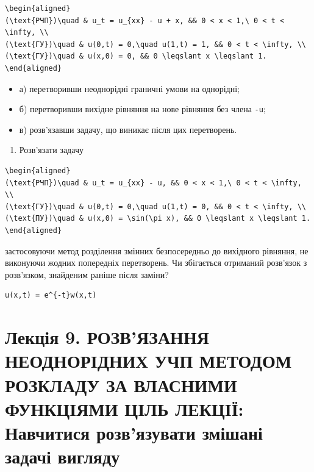 \documentclass[
  ukrainian,
]{article}
\providecommand{\tightlist}{%
  \setlength{\itemsep}{0pt}\setlength{\parskip}{0pt}}
\begin{document}
\begin{verbatim}
\begin{aligned}
(\text{РЧП})\quad & u_t = u_{xx} - u + x, && 0 < x < 1,\ 0 < t < \infty, \\
(\text{ГУ})\quad & u(0,t) = 0,\quad u(1,t) = 1, && 0 < t < \infty, \\
(\text{ГУ})\quad & u(x,0) = 0, && 0 \leqslant x \leqslant 1.
\end{aligned}
\end{verbatim}

\begin{itemize}
\tightlist
\item
  а) перетворивши неоднорідні граничні умови на однорідні;
\item
  б) перетворивши вихідне рівняння на нове рівняння без члена
  \texttt{-u};
\item
  в) розв'язавши задачу, що виникає після цих перетворень.
\end{itemize}

\begin{enumerate}
\def\labelenumi{\arabic{enumi}.}
\setcounter{enumi}{2}
\tightlist
\item
  Розв'язати задачу
\end{enumerate}

\begin{verbatim}
\begin{aligned}
(\text{РЧП})\quad & u_t = u_{xx} - u, && 0 < x < 1,\ 0 < t < \infty, \\
(\text{ГУ})\quad & u(0,t) = 0,\quad u(1,t) = 0, && 0 < t < \infty, \\
(\text{ПУ})\quad & u(x,0) = \sin(\pi x), && 0 \leqslant x \leqslant 1.
\end{aligned}
\end{verbatim}

застосовуючи метод розділення змінних безпосередньо до вихідного
рівняння, не виконуючи жодних попередніх перетворень. Чи збігається
отриманий розв'язок з розв'язком, знайденим раніше після заміни?

\begin{verbatim}
u(x,t) = e^{-t}w(x,t)
\end{verbatim}

\section{Лекція 9. РОЗВ'ЯЗАННЯ НЕОДНОРІДНИХ УЧП МЕТОДОМ РОЗКЛАДУ ЗА
ВЛАСНИМИ ФУНКЦІЯМИ ЦІЛЬ ЛЕКЦІЇ: Навчитися розв'язувати змішані задачі
вигляду}\label{ux43bux435ux43aux446ux456ux44f-9.-ux440ux43eux437ux432ux44fux437ux430ux43dux43dux44f-ux43dux435ux43eux434ux43dux43eux440ux456ux434ux43dux438ux445-ux443ux447ux43f-ux43cux435ux442ux43eux434ux43eux43c-ux440ux43eux437ux43aux43bux430ux434ux443-ux437ux430-ux432ux43bux430ux441ux43dux438ux43cux438-ux444ux443ux43dux43aux446ux456ux44fux43cux438-ux446ux456ux43bux44c-ux43bux435ux43aux446ux456ux457-ux43dux430ux432ux447ux438ux442ux438ux441ux44f-ux440ux43eux437ux432ux44fux437ux443ux432ux430ux442ux438-ux437ux43cux456ux448ux430ux43dux456-ux437ux430ux434ux430ux447ux456-ux432ux438ux433ux43bux44fux434ux443}
\end{document}
